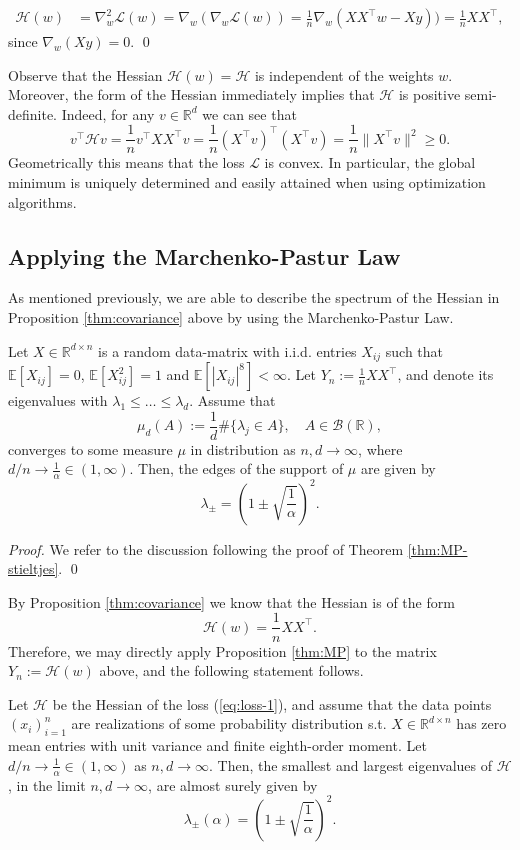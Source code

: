 \documentclass{article}
\begin{document}
\begin{align}
\mathcal{H}(w) &= \nabla_w^2\mathcal{L}(w) = \nabla_w(\nabla_w\mathcal{L}(w)) = \frac{1}{n}\nabla_w(X X^\top w-X y))=\frac{1}{n}X X^\top,
\end{align}
since $\nabla_w(X y)=0$.
\qed
\bigskip
\par
Observe that the Hessian $\mathcal{H}(w)=\mathcal{H}$ is independent of the weights $w$. Moreover, the form of the Hessian immediately implies that $\mathcal{H}$ is positive semi-definite. Indeed, for any $v\in\mathbb{R}^d$ we can see that
\begin{equation}
v^\top\mathcal{H}v=\frac{1}{n}v^\top X X^\top v=\frac{1}{n}(X^\top v)^\top(X^\top v)=\frac{1}{n}\|X^\top v\|^2\geq0.
\end{equation}
Geometrically this means that the loss $\mathcal{L}$ is convex. In particular, the global minimum is uniquely determined and easily attained when using optimization algorithms.

\subsection{Applying the Marchenko-Pastur Law}
As mentioned previously, we are able to describe the spectrum of the Hessian in Proposition \ref{thm:covariance} above by using the Marchenko-Pastur Law.
\begin{proposition}\label{thm:MP}
Let $X\in\mathbb{R}^{d\times n}$ is a random data-matrix with i.i.d. entries $X_{ij}$ such that $\mathbb{E}[X_{ij}]=0$, $\mathbb{E}[X_{ij}^2]=1$ and $\mathbb{E}[|X_{ij}|^8]<\infty$. Let $Y_n:=\frac{1}{n}X X^\top$, and denote its eigenvalues with $\lambda_1\leq\dots\leq\lambda_d$. Assume that
$$\mu_d(A):=\frac{1}{d}\#\{\lambda_j\in A\},\quad A\in\mathcal{B}(\mathbb{R}),$$
converges to some measure $\mu$ in distribution as $n,d\to\infty$, where $d/n\to \frac{1}{\alpha}\in(1,\infty)$. Then, the edges of the support of $\mu$ are given by
$$\lambda_\pm=\left(1\pm\sqrt{\frac{1}{\alpha}}\right)^2.$$
\end{proposition}
\smallskip
\noindent
\emph{Proof.} We refer to the discussion following the proof of Theorem \ref{thm:MP-stieltjes}.
\qed
\bigskip
\par
By Proposition \ref{thm:covariance} we know that the Hessian is of the form
\begin{equation}
\mathcal{H}(w)=\frac{1}{n}X X^\top.
\end{equation}
Therefore, we may directly apply Proposition \ref{thm:MP} to the matrix $Y_n:=\mathcal{H}(w)$ above, and the following statement follows.
\bigskip
\begin{corollary}\label{thm:lambda_pm}
Let $\mathcal{H}$ be the Hessian of the loss (\ref{eq:loss-1}), and assume that the data points ${(x_i)}_{i=1}^n$ are realizations of some probability distribution s.t. $X\in\mathbb{R}^{d\times n}$ has zero mean entries with unit variance and finite eighth-order moment. Let $d/n\to\frac{1}{\alpha}\in(1,\infty)$ as $n,d\to\infty$. Then, the smallest and largest eigenvalues of $\mathcal{H}$, in the limit $n,d\to\infty$, are almost surely given by
$$\lambda_\pm(\alpha)=\left(1\pm\sqrt{\frac{1}{\alpha}}\right)^2.$$
\end{corollary}
\end{document}
